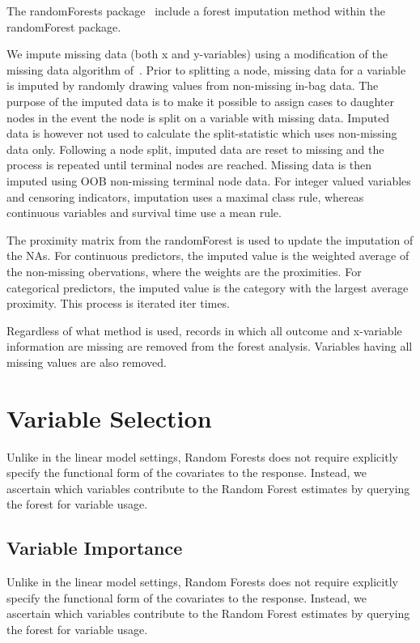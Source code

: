 \documentclass[nojss]{jss}\usepackage[]{graphicx}\usepackage[]{color}
\begin{document}
The randomForests package~\citep{liaw:2002} include a forest imputation method within the randomForest package. 

We impute missing data (both x and y-variables) using a modification of the missing data algorithm of~\cite{Ishwaran:2008}. Prior to splitting a node, missing data for a variable is imputed by randomly drawing values from non-missing in-bag data. The purpose of the imputed data is to make it possible to assign cases to daughter nodes in the event the node is split on a variable with missing data. Imputed data is however not used to calculate the split-statistic which uses non-missing data only. Following a node split, imputed data are reset to missing and the process is repeated until terminal nodes are reached. Missing data is then imputed using OOB non-missing terminal node data. For integer valued variables and censoring indicators, imputation uses a maximal class rule, whereas continuous variables and survival time use a mean rule.

The proximity matrix from the randomForest is used to update the imputation of the NAs. For continuous predictors, the imputed value is the weighted average of the non-missing obervations, where the weights are the proximities. For categorical predictors, the imputed value is the category with the largest average proximity. This process is iterated iter times.

Regardless of what method is used, records in which all outcome and x-variable information are missing are removed from the forest analysis. Variables having all missing values are also removed.


\section{Variable Selection}
Unlike in the linear model settings, Random Forests does not require explicitly specify the functional form of the covariates to the response. Instead, we ascertain which variables contribute to the Random Forest estimates by querying the forest for variable usage. 

\subsection{Variable Importance}\label{S:vimp}
Unlike in the linear model settings, Random Forests does not require explicitly specify the functional form of the covariates to the response. Instead, we ascertain which variables contribute to the Random Forest estimates by querying the forest for variable usage. 
\end{document}
